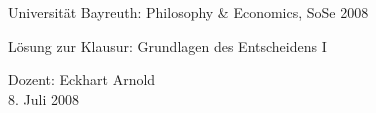 \documentclass[11pt, a4paper, german]{article}
\numberwithin {equation}{section}
\begin{document}
\begin{center}
{\large Universität Bayreuth: Philosophy \& Economics, SoSe 2008}
\end{center}
\vspace{0.4em}
\begin{center}
{\huge Lösung zur Klausur: Grundlagen des Entscheidens I}
\end{center}
\vspace{0.0em}
\begin{center}
Dozent: Eckhart Arnold\\ 
8. Juli 2008 
\end{center}



\end{document}
